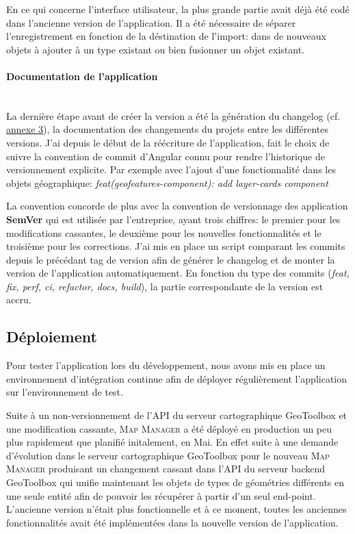 \documentclass{rapportUHA40}
\begin{document}
En ce qui concerne l'interface utilisateur, la plus grande partie avait déjà
été codé dans l'ancienne version de l'application. Il a été nécessaire de
séparer l'enregistrement en fonction de la déstination de l'import: dans de
nouveaux objets à ajouter à un type existant ou bien fusionner un objet
existant. \\

\paragraph{Documentation de l'application}\mbox{}\\
La dernière étape avant de créer la version a été la génération du changelog
(cf. \hyperlink{ANNEX3}{annexe 3}), la documentation des changements du projets
entre les différentes versions. J'ai depuis le début de la réécriture de
l'application, fait le choix de suivre la convention de commit d'Angular connu
pour rendre l'historique de versionnement explicite. Par exemple avec l'ajout d'une
fonctionnalité dans les objets géographique: \textit{feat(geofeatures-component): add layer-cards component}

La convention concorde de plus avec la convention de versionnage des
application \textbf{SemVer} qui est utilisée par l'entreprise, ayant trois
chiffres: le premier pour les modifications cassantes, le deuxième pour les
nouvelles fonctionnalités et le troisième pour les corrections. J'ai mis en
place un script comparant les commits depuis le précédant tag de version afin
de générer le changelog et de monter la version de l'application
automatiquement. En fonction du type des commits (\textit{feat, fix, perf, ci,
  refactor, docs, build}), la partie correspondante de la version est accru.

\subsection{Déploiement}
Pour tester l'application lors du développement, nous avons mis en place un
environnement d'intégration continue afin de déployer régulièrement
l'application sur l'environnement de test.

Suite à un non-versionnement de l'API du serveur cartographique GeoToolbox et
une modification cassante, \textsc{Map Manager} a été déployé en production un
peu plus rapidement que planifié initalement, en Mai. En effet suite à une
demande d'évolution dans le serveur cartographique GeoToolbox pour le nouveau
\textsc{Map Manager} produisant un changement cassant dans l'API du serveur
backend GeoToolbox qui unifie maintenant les objets de types de géométries
différents en une seule entité afin de pouvoir les récupérer à partir d'un seul
end-point. L'ancienne version n'était plus fonctionnelle et à ce moment, toutes
les anciennes fonctionnalités avait été implémentées dans la nouvelle version
de l'application.
\end{document}
